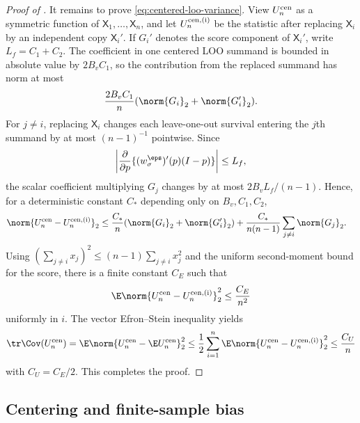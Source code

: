 \begin{proof}[Proof of ]
It remains to prove \eqref{eq:centered-loo-variance}.  View $U_n^{\rm cen}$ as a symmetric function of $\mathsf X_1,\ldots,\mathsf X_n$, and let $U_n^{\rm cen,(i)}$ be the statistic after replacing $\mathsf X_i$ by an independent copy $\mathsf X_i'$.  If $G_i'$ denotes the score component of $\mathsf X_i'$, write $L_f=C_1+C_2$.  The coefficient in one centered LOO summand is bounded in absolute value by $2B_vC_1$, so the contribution from the replaced summand has norm at most
\[
 \frac{2B_vC_1}{n}(\norm{G_i}_2+\norm{G_i'}_2).
\]
For $j\ne i$, replacing $\mathsf X_i$ changes each leave-one-out survival entering the $j$th summand by at most $(n-1)^{-1}$ pointwise.  Since
\[
 \left|\frac{\partial}{\partial p}\{(w_\sigma^\eps)'(p)(I-p)\}\right|
 \le L_f,
\]
the scalar coefficient multiplying $G_j$ changes by at most
$2B_vL_f/(n-1)$.  Hence, for a deterministic constant $C_*$ depending only on $B_v,C_1,C_2$,
\begin{align*}
 \norm{U_n^{\rm cen}-U_n^{\rm cen,(i)}}_2
 &\le \frac{C_*}{n}(\norm{G_i}_2+\norm{G_i'}_2)
 +\frac{C_*}{n(n-1)}\sum_{j\ne i}\norm{G_j}_2.
\end{align*}
Using $(\sum_{j\ne i}x_j)^2\le(n-1)\sum_{j\ne i}x_j^2$ and the uniform second-moment bound for the score, there is a finite constant $C_E$ such that
\[
 \E\norm{U_n^{\rm cen}-U_n^{\rm cen,(i)}}_2^2
 \le\frac{C_E}{n^2}
\]
uniformly in $i$.  The vector Efron--Stein inequality yields
\[
 \tr\Cov(U_n^{\rm cen})
 =\E\norm{U_n^{\rm cen}-\E U_n^{\rm cen}}_2^2
 \le\frac12\sum_{i=1}^{n}
 \E\norm{U_n^{\rm cen}-U_n^{\rm cen,(i)}}_2^2
 \le\frac{C_U}{n}
\]
with $C_U=C_E/2$.  This completes the proof.
\end{proof}


\subsection{Centering and finite-sample bias}

